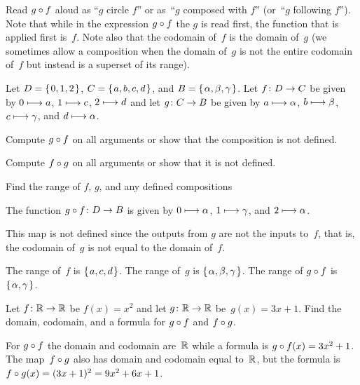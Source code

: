 \documentclass{ibl}  %
\begin{document}
Read $g\mathbin{\circ} f$ aloud as ``$g$ circle $f$'' 
or as~``$g$ composed with $f$''
(or~``$g$ following $f$'').
Note that while
in the expression $g\mathbin{\circ} f$ the $g$ is read first,
the function that is applied first is~$f$. 
Note also that the codomain of~$f$ is the domain of~$g$
(we sometimes 
allow a composition when the domain of~$g$ is not the 
entire codomain of~$f$ but instead is a superset of its range).


\begin{problem} Let $D=\mbox{$\{\hspace{0.1em}0,1,2\hspace{0.1em}\}$}$, $C=\mbox{$\{\hspace{0.1em}a,b,c,d\hspace{0.1em}\}$}$, 
and $B=\mbox{$\{\hspace{0.1em}\alpha,\beta,\gamma\hspace{0.1em}\}$}$.
Let $\mbox{$f\colon D\to C$}$ be given by $0\stackrel{}{\longmapsto} a$, $1\stackrel{}{\longmapsto} c$, 
$2\stackrel{}{\longmapsto} d$ and let $\mbox{$g\colon C\to B$}$
be given by 
$a\stackrel{}{\longmapsto}\alpha$, $b\stackrel{}{\longmapsto} \beta$, $c\stackrel{}{\longmapsto}\gamma$,
and $d\stackrel{}{\longmapsto}\alpha$.
\begin{items}
\item Compute $g\mathbin{\circ} f$ on all arguments or show that the composition
  is not defined.
\item Compute $f\mathbin{\circ} g$ on all arguments or show that it is not defined.
\item Find the range of $f$, $g$, and any defined compositions    
\end{items}
\begin{answer}
\begin{items}
\item The function $\mbox{$g\mathbin{\circ} f\colon D\to B$}$ is given by 
  $0\stackrel{}{\longmapsto}\alpha$, $1\stackrel{}{\longmapsto}\gamma$, and $2\stackrel{}{\longmapsto}\alpha$.
\item This map is not defined since the outputs from $g$ are not the inputs
  to~$f$, that is, the codomain of~$g$ is not equal to 
  the domain of~$f$.
\item The range of~$f$ is $\mbox{$\{\hspace{0.1em}a,c,d\hspace{0.1em}\}$}$.
  The range of~$g$ is $\mbox{$\{\hspace{0.1em}\alpha,\beta,\gamma\hspace{0.1em}\}$}$. 
  The range of $g\mathbin{\circ} f$ is $\mbox{$\{\hspace{0.1em}\alpha,\gamma\hspace{0.1em}\}$}$.
\end{items}
\end{answer}
\end{problem}

\begin{problem}[\midlength]
Let $\mbox{$f\colon \mathbb{R}\to \mathbb{R}$}$ be $f(x)=x^2$ and let $\mbox{$g\colon \mathbb{R}\to \mathbb{R}$}$ be~$g(x)=3x+1$.
Find the domain, codomain, and a formula for
$g\mathbin{\circ} f$ and $f\mathbin{\circ} g$.  
\begin{answer}
For $g\mathbin{\circ} f$ the domain and codomain are~$\mathbb{R}$ while a formula is
$g\mathbin{\circ} f(x)=3x^2+1$.
The map~$f\mathbin{\circ} g$ also has domain and codomain equal to~$\mathbb{R}$,
but the formula is~$f\mathbin{\circ} g(x)=(3x+1)^2=9x^2+6x+1$.
\end{answer}
\end{problem}
\end{document}
